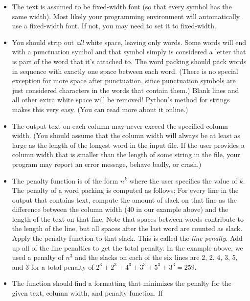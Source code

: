 \documentclass{ks-pset}
\begin{document}
\begin{problem}
  \begin{itemize}
    \item The text is assumed to be fixed-width font (so that every symbol has
      the same width).  Most likely your programming environment will
      automatically use a fixed-width font.  If not, you may need to set it to
      fixed-width.
    \item You should strip out \emph{all} white space, leaving only words. Some
      words will end with a punctuation symbol and that symbol simply is
      considered a letter that is part of the word that it's attached to. The
      word packing should pack words in sequence with exactly one space between
      each word.  (There is no special exception for more space after
      punctuation, since punctuation symbols are just considered characters in
      the words that contain them.)  Blank lines and all other extra white
      space will be removed!  Python's  method for strings makes
      this very easy.  (You can read more about it online.)
    \item The output text on each column may never exceed the specified column
      width.  (You should assume that the column width will always be at least
      as large as the length of the longest word in the input file. If the user
      provides a column width that is smaller than the length of some string in
      the file, your program may report an error message, behave badly, or
      crash.)
    \item The penalty function is of the form \(n^k\) where the user specifies
      the value of \(k\).  The penalty of a word packing is computed as
      follows: For every line in the output that contains text, compute the
      amount of slack on that line as the difference between the column width
      (40 in our example above) and the length of the text on that line.  Note
      that spaces between words contribute to the length of the line, but all
      spaces after the last word are counted as slack. Apply the penalty
      function to that slack.  This is called the \emph{line penalty}.  Add up
      all of the line penalties to get the total penalty.  In the example
      above, we used a penalty of \(n^3\) and the slacks on each of the six
      lines are 2, 2, 4, 3, 5, and 3 for a total penalty of
      \(2^3+2^3+4^3+3^3+5^3+3^3=259\).
    \item The  function should find a formatting that minimizes
      the penalty for the given text, column width, and penalty function. If

\end{itemize}
\end{problem}
\end{document}
